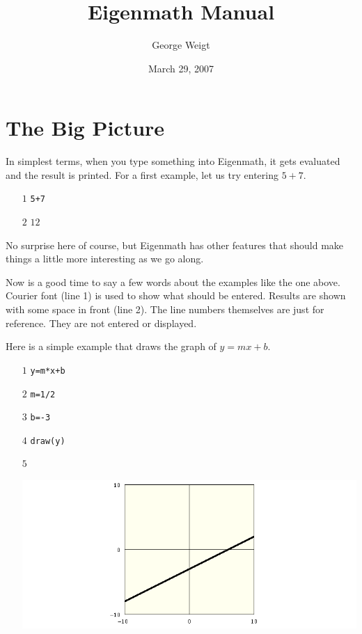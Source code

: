 \documentclass[12pt,openany]{report}
\title{Eigenmath Manual}
\author{George Weigt}
\date{March 29, 2007}
\begin{document}
\maketitle
\tableofcontents

\newpage

\chapter{The Big Picture}
In simplest terms, when you type something into Eigenmath,
it gets evaluated and the result is printed.
For a first example, let us try entering $5+7$.

\medskip
\noindent
\begin{itemize}
\item[$\scriptstyle1$]{\tt 5+7}
\item[$\scriptstyle2$]\hspace{50pt} $12$
\end{itemize}

\medskip
\noindent
No surprise here of course, but Eigenmath has other features
that should make things a little more interesting as we go along.

\medskip
\noindent
Now is a good time to say a few words about the examples like the one above.
Courier font (line 1) is used to show what should be entered.
Results are shown with some space in front (line 2).
The line numbers themselves are just for reference.
They are not entered or displayed.

\newpage

\noindent
Here is a simple example that draws the graph of $y=mx+b$.

\medskip
\noindent
\begin{itemize}
\item[$\scriptstyle1$]{\tt y=m*x+b}
\item[$\scriptstyle2$]{\tt m=1/2}
\item[$\scriptstyle3$]{\tt b=-3}
\item[$\scriptstyle4$]{\tt draw(y)}
\item[$\scriptstyle5$]
\item[]\includegraphics[scale=0.5]{1.png}
\end{itemize}
\end{document}
